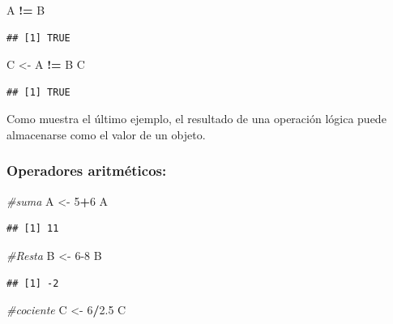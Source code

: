 \documentclass[]{book}
\newenvironment{Shaded}{\begin{snugshade}}{\end{snugshade}}
\newcommand{\CommentTok}[1]{\textcolor[rgb]{0.56,0.35,0.01}{\textit{#1}}}
\newcommand{\DecValTok}[1]{\textcolor[rgb]{0.00,0.00,0.81}{#1}}
\newcommand{\FloatTok}[1]{\textcolor[rgb]{0.00,0.00,0.81}{#1}}
\newcommand{\NormalTok}[1]{#1}
\newcommand{\OperatorTok}[1]{\textcolor[rgb]{0.81,0.36,0.00}{\textbf{#1}}}
\newcommand{\StringTok}[1]{\textcolor[rgb]{0.31,0.60,0.02}{#1}}
\begin{document}
\begin{Shaded}
\begin{Highlighting}[]
\NormalTok{A }\OperatorTok{!=}\StringTok{ }\NormalTok{B}
\end{Highlighting}
\end{Shaded}

\begin{verbatim}
## [1] TRUE
\end{verbatim}

\begin{Shaded}
\begin{Highlighting}[]
\NormalTok{C <-}\StringTok{ }\NormalTok{A }\OperatorTok{!=}\StringTok{ }\NormalTok{B}
\NormalTok{C}
\end{Highlighting}
\end{Shaded}

\begin{verbatim}
## [1] TRUE
\end{verbatim}

Como muestra el último ejemplo, el resultado de una operación lógica puede almacenarse como el valor de un objeto.

\hypertarget{operadores-aritmeticos}{%
\subsubsection{Operadores aritméticos:}\label{operadores-aritmeticos}}

\begin{Shaded}
\begin{Highlighting}[]
\CommentTok{#suma}
\NormalTok{A <-}\StringTok{ }\DecValTok{5}\OperatorTok{+}\DecValTok{6}
\NormalTok{A}
\end{Highlighting}
\end{Shaded}

\begin{verbatim}
## [1] 11
\end{verbatim}

\begin{Shaded}
\begin{Highlighting}[]
\CommentTok{#Resta}
\NormalTok{B <-}\StringTok{ }\DecValTok{6-8}
\NormalTok{B}
\end{Highlighting}
\end{Shaded}

\begin{verbatim}
## [1] -2
\end{verbatim}

\begin{Shaded}
\begin{Highlighting}[]
\CommentTok{#cociente}
\NormalTok{C <-}\StringTok{ }\DecValTok{6}\OperatorTok{/}\FloatTok{2.5}
\NormalTok{C}
\end{Highlighting}
\end{Shaded}
\end{document}
